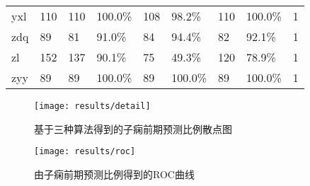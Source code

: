 \begin{landscape}
\begin{longtable}{m{2cm}<{\centering}m{2cm}<{\centering}m{2cm}<{\centering}m{2cm}<{\centering}m{2cm}<{\centering}m{2cm}<{\centering}m{2cm}<{\centering}m{2cm}<{\centering}m{2cm}<{\centering}}
            yxl                   & 110                   & 110        & 100.0\%    & 108        & 98.2\%     & 110        & 100.0\%     & 1                                                                      \\
            zdq                   & 89                    & 81         & 91.0\%     & 84         & 94.4\%     & 82         & 92.1\%      & 1                                                                      \\
            zl                    & 152                   & 137        & 90.1\%     & 75         & 49.3\%     & 120        & 78.9\%      & 1                                                                      \\
            zyy                   & 89                    & 89         & 100.0\%    & 89         & 100.0\%    & 89         & 100.0\%     & 1                                                                       \\    
      \end{longtable}
\end{landscape}

\begin{figure}[htbp]
      \centering
      \texttt{[image: results/detail]}
      \caption[基于三种算法得到的子痫前期预测比例散点图]{\label{fig:model_detail}基于三种算法得到的子痫前期预测比例散点图}
\end{figure}

\begin{figure}[htbp]
      \centering
      \texttt{[image: results/roc]}
      \caption[由子痫前期预测比例得到的ROC曲线]{\label{fig:model_roc}由子痫前期预测比例得到的ROC曲线}
\end{figure}

